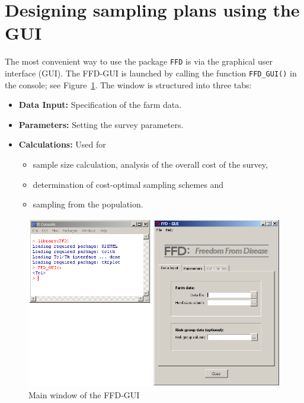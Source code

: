 \documentclass[nojss]{jss}
\begin{document}
\clearpage

\section{Designing sampling plans using the GUI} \label{sec:using-ffd-GUI}

The most convenient way to use the package \texttt{FFD} is via the   graphical user interface (GUI). The FFD-GUI is launched by calling the function \verb+FFD_GUI()+   in the  console; see Figure~\ref{fig:GUI_reset}. The window is structured into three tabs:

\begin{itemize}
\item \textbf{Data Input:} Specification of the farm data.
\item \textbf{Parameters:} Setting the survey parameters.
\item \textbf{Calculations:} Used for
    \begin{itemize}
    \item sample size calculation, analysis of the overall cost of the survey,
    \item determination of cost-optimal sampling schemes and
    \item sampling from the population.
    \end{itemize}
\end{itemize}


\begin{figure}[h!t]
\begin{center}
\includegraphics[width=120mm]{GUI_Reset.png}
\end{center}
\caption{Main window of the FFD-GUI}
\label{fig:GUI_reset}
\end{figure}
\end{document}

